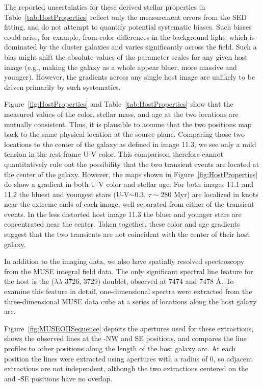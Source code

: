 The reported uncertainties for these derived stellar properties in
Table~\ref{tab:HostProperties} reflect only the measurement errors
from the SED fitting, and do not attempt to quantify potential
systematic biases.  Such biases could arise, for example, from color
differences in the background light, which is dominated by the cluster
galaxies and varies significantly across the  field.  Such a
bias might shift the absolute values of the parameter scales for any
given host image (e.g., making the galaxy as a whole appear bluer,
more massive and younger). However, the gradients across any single
host image are unlikely to be driven primarily by such systematics.

Figure~\ref{fig:HostProperties} and Table~\ref{tab:HostProperties}
show that the measured values of the color, stellar mass, and age at
the two \spock locations are mutually consistent. Thus, it is
plausible to assume that the two positions map back to the same
physical location at the source plane.  Comparing those two locations
to the center of the galaxy as defined in image 11.3, we see only a
mild tension in the rest-frame U-V color. This comparison therefore
cannot quantitatively rule out the possibility that the two transient
events are located at the center of the galaxy. However, the maps
shown in Figure~\ref{fig:HostProperties} do show a gradient in both
U-V color and stellar age. For both images 11.1 and 11.2 the bluest
and youngest stars (U-V$\sim$0.3, $\tau\sim$280 Myr) are localized in
knots near the extreme ends of each image, well separated from either
of the \spock transient events.  In the less distorted host image 11.3
the bluer and younger stars are concentrated near the center. Taken
together, these color and age gradients suggest that the two
transients are not coincident with the center of their host galaxy.



In addition to the \HST imaging data, we also have spatially resolved
spectroscopy from the MUSE integral field data.
The only significant
spectral line feature for the \spock host is the 
($\lambda\lambda$ 3726, 3729) doublet, observed at 7474 and 7478
\AA.
To examine this feature in detail, one-dimensional spectra were extracted from the three-dimensional MUSE data cube at a series of locations along the \spock host galaxy arc. 

Figure~\ref{fig:MUSEOIISequence} depicts the apertures used for these
extractions, shows the observed  lines at the
\spock-NW and SE positions, and compares the  line
profiles to other positions along the length of the host galaxy arc.
At each position the lines were extracted using apertures with a
radius of 0, so adjacent extractions are not independent,
although the two extractions centered on the \spockone and -SE
positions have no overlap.  

